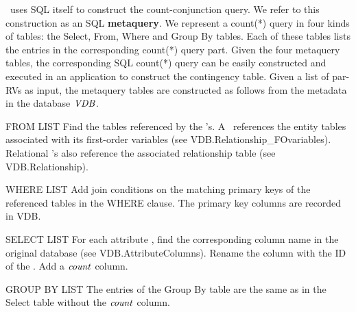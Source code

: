 \documentclass{IEEEtran}
\begin{document}
\FB\ uses SQL itself to construct the count-conjunction query. We refer to this construction as an SQL \textbf{metaquery}. We represent a count(*) query in 
four kinds of tables: the Select, From, Where and Group By tables. Each of these tables lists the entries in the corresponding count(*) query part.
%
Given the four metaquery tables, the corresponding SQL count(*) query can be easily constructed and executed in an application to construct the contingency table.
Given a list of par-RVs as input, the metaquery tables are constructed as follows
from the metadata in the database ${\it VDB }$.  




\begin{LaTeXdescription}
\item[FROM LIST] Find the tables referenced by the \RRV's. A \RRV ~references the entity tables associated with its first-order variables (see VDB.Relationship\_FOvariables). Relational \RRV's also reference the associated relationship table (see VDB.Relationship). 
\item[WHERE LIST] Add join conditions on the matching primary keys of the referenced tables in the WHERE clause. The primary key columns are recorded in VDB. 
\item[SELECT LIST] For each attribute \RRV, find the corresponding column name in the original database (see VDB.AttributeColumns). Rename the column with the ID of the \RRV. Add a $\it{count}$ column.
\item[GROUP BY LIST] The entries of the Group By table are the same as in the Select table without the $\it{count}$ column.
\end{LaTeXdescription}

\end{document}
